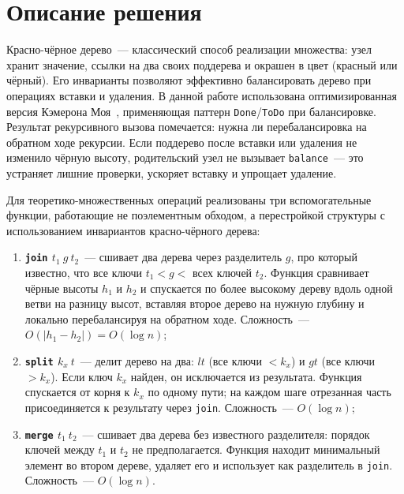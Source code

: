 \documentclass[a4paper]{article}
\begin{document}
\section{Описание решения}
Красно-чёрное дерево~--- классический способ реализации множества: узел хранит значение, 
ссылки на два своих поддерева и окрашен в цвет (красный или чёрный). 
Его инварианты позволяют эффективно балансировать дерево при операциях вставки и удаления. 
В данной работе использована оптимизированная версия Кэмерона Моя~\cite{Moy}, применяющая 
паттерн \texttt{Done}/\texttt{ToDo} при балансировке. Результат
рекурсивного вызова помечается: нужна ли перебалансировка на обратном ходе
рекурсии. Если поддерево после вставки или удаления не изменило чёрную высоту, 
родительский узел не вызывает \texttt{balance}~--- это
устраняет лишние проверки, ускоряет вставку и упрощает удаление.

Для теоретико-множественных операций реализованы три вспомогательные функции,
работающие не поэлементным обходом, а перестройкой структуры с использованием
инвариантов красно-чёрного дерева:
\begin{enumerate}
    \item \textbf{\texttt{join} $t_1\ g\ t_2$}~--- сшивает два дерева через
          разделитель $g$, про который известно, что все ключи $t_1 < g <$
          всех ключей $t_2$. Функция сравнивает чёрные высоты $h_1$ и $h_2$ и
          спускается по более высокому дереву вдоль одной ветви на разницу
          высот, вставляя второе дерево на нужную глубину и локально
          перебалансируя на обратном ходе. Сложность~--- $O(|h_1 - h_2|) =
          O(\log n)$;

    \item \textbf{\texttt{split} $k_x\ t$}~--- делит дерево на два: $lt$ (все
          ключи $< k_x$) и $gt$ (все ключи $> k_x$). Если ключ $k_x$ найден,
          он исключается из результата. Функция спускается от корня к $k_x$
          по одному пути; на каждом шаге отрезанная часть присоединяется к
          результату через \texttt{join}. Сложность~--- $O(\log n)$;

    \item \textbf{\texttt{merge} $t_1\ t_2$}~--- сшивает два дерева без
          известного разделителя: порядок ключей между $t_1$ и $t_2$ не
          предполагается. Функция находит минимальный элемент во втором
          дереве, удаляет его и использует как разделитель в \texttt{join}.
          Сложность~--- $O(\log n)$.
\end{enumerate}
\end{document}
